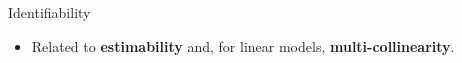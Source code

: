 \begin{frame}{\vskip -0.2cm \LARGE Identifiability}
\begin{itemize}
\begin{equation*}
\begin{array}{c}
		\textnormal{\tiny \# parameters of} \\
		\textnormal{\tiny distribution of} \\
		\textnormal{\tiny observations}
	\end{array}\!\!\right)
	\geq
	\left(\!\!\begin{array}{c}
		\textnormal{\tiny \# parameters of} \\
		\textnormal{\tiny statistical model}
	\end{array}\!\!\right)
	\;\;\not\Longrightarrow\;\;
	\begin{array}{c}
		\textnormal{\scriptsize model is} \\
		\textnormal{\scriptsize identifiable.}
	\end{array}
	\end{equation*}
	\vskip 0.2cm
\pause\item
	\footnotesize
	Related to \textbf{estimability} and, for linear models, \textbf{multi-collinearity}.
\end{itemize}

\end{frame}
\normalsize

